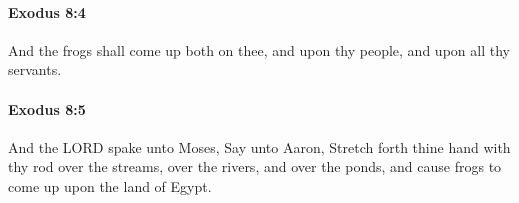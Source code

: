 		\paragraph{Exodus 8:4} %
			\label{EXODUS-8-4}

			And the frogs shall come up both on thee, and upon thy people, and upon all thy servants.


		\paragraph{Exodus 8:5} %
			\label{EXODUS-8-5}

			And the LORD spake unto Moses, Say unto Aaron, Stretch forth thine hand with thy rod over the streams, over the rivers, and over the ponds, and cause frogs to come up upon the land of Egypt.


